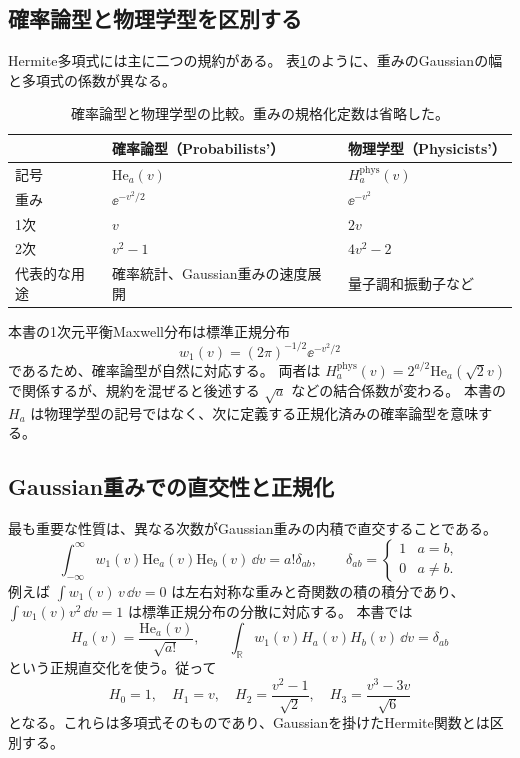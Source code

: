 \subsection{確率論型と物理学型を区別する}
Hermite多項式には主に二つの規約がある。
表\ref{tab:hermite-conventions}のように、重みのGaussianの幅と多項式の係数が異なる。
\begin{table}[htbp]
\centering\small
\caption{確率論型と物理学型の比較。重みの規格化定数は省略した。}
\label{tab:hermite-conventions}
\begin{tabularx}{\textwidth}{lXX}
\toprule & 確率論型（Probabilists'） & 物理学型（Physicists'） \\\midrule
記号 & $\mathrm{He}_a(v)$ & $H_a^{\mathrm{phys}}(v)$\\
重み & $\ee^{-v^2/2}$ & $\ee^{-v^2}$\\
1次 & $v$ & $2v$\\
2次 & $v^2-1$ & $4v^2-2$\\
代表的な用途 & 確率統計、Gaussian重みの速度展開 & 量子調和振動子など\\
\bottomrule
\end{tabularx}
\end{table}
本書の1次元平衡Maxwell分布は標準正規分布
\[
w_1(v)=(2\pi)^{-1/2}\ee^{-v^2/2}
\]
であるため、確率論型が自然に対応する。
両者は $H_a^{\mathrm{phys}}(v)=2^{a/2}\mathrm{He}_a(\sqrt2v)$ で関係するが、規約を混ぜると後述する $\sqrt a$ などの結合係数が変わる。
本書の $H_a$ は物理学型の記号ではなく、次に定義する正規化済みの確率論型を意味する。

\subsection{Gaussian重みでの直交性と正規化}
最も重要な性質は、異なる次数がGaussian重みの内積で直交することである。
\[
\boxed{\int_{-\infty}^{\infty}w_1(v)\mathrm{He}_a(v)\mathrm{He}_b(v)\,\dd v
=a!\delta_{ab}},\qquad
\delta_{ab}=\begin{cases}1 & a=b,\\0 & a\ne b.\end{cases}
\]
例えば $\int w_1(v)\,v\,\dd v=0$ は左右対称な重みと奇関数の積の積分であり、
$\int w_1(v)v^2\,\dd v=1$ は標準正規分布の分散に対応する。
本書では
\[
\boxed{H_a(v)=\frac{\mathrm{He}_a(v)}{\sqrt{a!}}},\qquad
\boxed{\int_{\mathbb R}w_1(v)H_a(v)H_b(v)\,\dd v=\delta_{ab}}
\]
という正規直交化を使う。従って
\[
H_0=1,\quad H_1=v,\quad H_2=\frac{v^2-1}{\sqrt2},\quad
H_3=\frac{v^3-3v}{\sqrt6}
\]
となる。これらは多項式そのものであり、Gaussianを掛けたHermite関数とは区別する。

